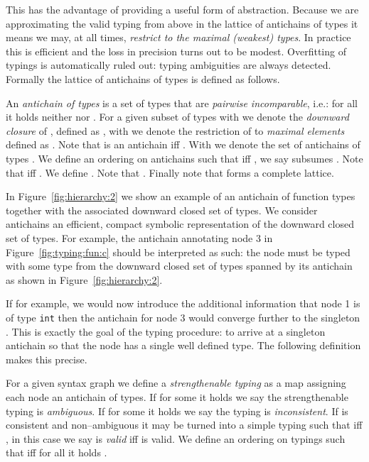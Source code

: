 \documentclass{sigplanconf}
\newcommand{\concept}[1]{\emph{#1}}
\begin{document}
This has the advantage of providing a useful form of
abstraction. Because we are approximating the valid typing from above
in the lattice of antichains of types it means we may, at all times,
\concept{restrict to the maximal (weakest) types}. In practice this is
efficient and the loss in precision turns out to be
modest. Overfitting of typings is automatically ruled out: typing
ambiguities are always detected.
Formally the lattice of antichains of types is defined as follows.
\begin{definition}[Antichains]\label{def:antichains}
An \concept{antichain of types}  is a set of types that
are \concept{pairwise incomparable}, i.e.: for all  it
holds neither  nor . For a given subset of
types  with  we denote the \concept{downward
  closure} of , defined as , with  we denote the restriction
of  to \concept{maximal elements} defined as . Note that  is an antichain iff . With  we
denote the set of antichains of types . We define an ordering  on
antichains such that  iff , we say  subsumes . Note that  iff . We define . Note that . Finally note that  forms a complete lattice.
\end{definition}
In Figure~\ref{fig:hierarchy:2} we show an example of an antichain of
function types together with the associated downward closed set of
types. We consider antichains an efficient, compact symbolic
representation of the downward closed set of types. For example, the
antichain annotating node 3 in Figure~\ref{fig:typing:fun:c} should be
interpreted as such: the node must be typed with some type from the
downward closed set of types spanned by its antichain as shown in
Figure~\ref{fig:hierarchy:2}. 

If for example, we would now introduce the additional information that
node 1 is of type \verb+int+ then the antichain for node 3 would
converge further to the singleton . This is exactly the goal of the typing procedure: to arrive at a
singleton antichain so that the node has a single well defined
type. The following definition makes this precise.

\begin{definition} 
For a given syntax graph  we define a \concept{strengthenable typing} as
a map  assigning each node an antichain of
types. If for some  it holds  we say the
strengthenable typing is \concept{ambiguous}. If for some  it holds
 we say the typing is \concept{inconsistent}. 
If  is consistent and non--ambiguous it may be turned into a
simple typing  such that  iff , in this case we say  is \emph{valid} iff  is
valid. We define an ordering  on typings such that
 iff for all  it holds .
\end{definition}
\end{document}
